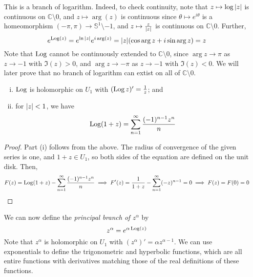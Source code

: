 This is a branch of logarithm.
Indeed, to check continuity, note that \( z \mapsto \log\abs{z} \) is continuous on \( \mathbb C \setminus \qty{0} \), and \( z \mapsto \arg(z) \) is continuous since \( \theta \mapsto e^{i\theta} \) is a homeomorphism \( (-\pi, \pi) \to \mathbb S^1 \setminus \qty{-1} \), and \( z \mapsto \frac{z}{\abs{z}} \) is continuous on \( \mathbb C \setminus \qty{0} \).
Further,
\[ e^{\operatorname{Log}(z)} = e^{\ln\abs{z}} e^{i \arg(z)} = \abs{z} \qty(\cos \arg z + i \sin \arg z) = z \]
Note that \( \operatorname{Log} \) cannot be continuously extended to \( \mathbb C \setminus \qty{0} \), since \( \arg z \to \pi \) as \( z \to -1 \) with \( \Im(z) > 0 \), and \( \arg z \to -\pi \) as \( z \to -1 \) with \( \Im(z) < 0 \).
We will later prove that no branch of logarithm can extist on all of \( \mathbb C \setminus \qty{0} \).
\begin{proposition}
	\begin{enumerate}[(i)]
		\item \( \operatorname{Log} \) is holomorphic on \( U_1 \) with \( (\operatorname{Log} z)' = \frac{1}{z} \); and
		\item for \( \abs{z} < 1 \), we have
			\[ \operatorname{Log}(1+z) = \sum_{n=1}^\infty \frac{(-1)^{n-1} z^n}{n} \]
	\end{enumerate}
\end{proposition}
\begin{proof}
	Part (i) follows from the above.
	The radius of convergence of the given series is one, and \( 1 + z \in U_1 \), so both sides of the equation are defined on the unit disk.
	Then,
	\[ F(z) = \operatorname{Log}(1+z) - \sum_{n=1}^\infty \frac{(-1)^{n-1}z^n}{n} \implies F'(z) = \frac{1}{1+z} - \sum_{n=1}^\infty (-z)^{n-1} = 0 \implies F(z) = F(0) = 0 \]
\end{proof}
We can now define the \textit{principal branch of \( z^\alpha \)} by
\[ z^\alpha = e^{\alpha \operatorname{Log}(z)} \]
Note that \( z^\alpha \) is holomorphic on \( U_1 \) with \( (z^\alpha)' = \alpha z^{\alpha - 1} \).
We can use exponentials to define the trigonometric and hyperbolic functions, which are all entire functions with derivatives matching those of the real definitions of these functions.

